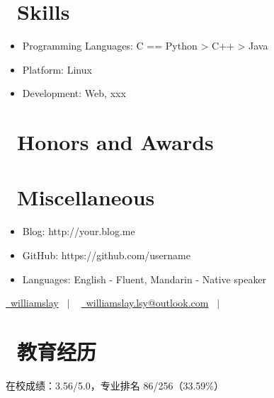 \documentclass{resume}
\begin{document}

\section{\faCogs\ Skills}
\begin{itemize}[parsep=0.5ex]
  \item Programming Languages: C == Python > C++ > Java
  \item Platform: Linux
  \item Development: Web, xxx
\end{itemize}

\section{\faHeartO\ Honors and Awards}

\section{\faInfo\ Miscellaneous}
\begin{itemize}[parsep=0.5ex]
  \item Blog: http://your.blog.me
  \item GitHub: https://github.com/username
  \item Languages: English - Fluent, Mandarin - Native speaker
\end{itemize}

\clearpage

\basicInfo
{
\href{https://github.com/williamslay}{\raisebox{-0.05\height}\faGithub\ williamslay} \ $|$ \
\href{mailto:williamslay.lsy@outlook.com}{\raisebox{-0.05\height}\faEnvelope \ williamslay.lsy@outlook.com} \ $|$ \
\href{tel:18851986021}{\raisebox{-0.05\height}} \\
}
\section{\faGraduationCap\ 教育经历}
在校成绩：3.56/5.0，专业排名 86/256（33.59\%）
\end{document}
